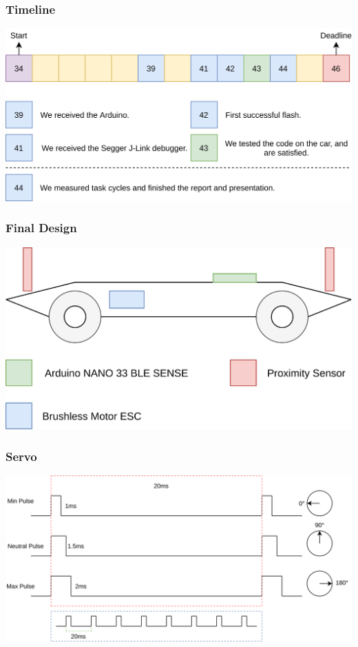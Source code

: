 \documentclass{beamer}
\begin{document}
    \begin{frame}
        \frametitle{Timeline}
        \includegraphics[width=\linewidth]{img/timeline.png}
    \end{frame}

    \begin{frame}
        \frametitle{Final Design}
        \centering
        \includegraphics[scale=0.065]{img/final-design.png}
    \end{frame}

    \begin{frame}
        \frametitle{Servo}
        \includegraphics[width=\linewidth]{img/servo.png}
    \end{frame}
\end{document}
